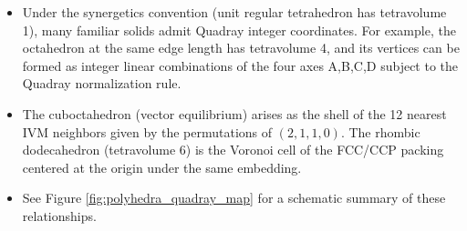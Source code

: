 \documentclass[
  10pt,
]{article}
\providecommand{\tightlist}{%
  \setlength{\itemsep}{0pt}\setlength{\parskip}{0pt}}
\begin{document}
\begin{itemize}
\tightlist
\item
  Under the synergetics convention (unit regular tetrahedron has
  tetravolume 1), many familiar solids admit Quadray integer
  coordinates. For example, the octahedron at the same edge length has
  tetravolume 4, and its vertices can be formed as integer linear
  combinations of the four axes A,B,C,D subject to the Quadray
  normalization rule.
\item
  The cuboctahedron (vector equilibrium) arises as the shell of the 12
  nearest IVM neighbors given by the permutations of \((2,1,1,0)\). The
  rhombic dodecahedron (tetravolume 6) is the Voronoi cell of the
  FCC/CCP packing centered at the origin under the same embedding.
\item
  See Figure \ref{fig:polyhedra_quadray_map} for a schematic summary of
  these relationships.
\end{itemize}
\end{document}
